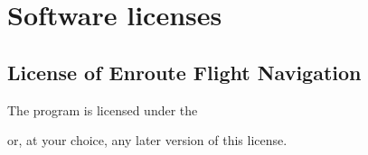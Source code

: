 \documentclass[letterpaper,10pt,english]{sphinxmanual}
\begin{document}
\chapter{Software licenses}
\label{\detokenize{04-appendix/licenses:software-licenses}}\label{\detokenize{04-appendix/licenses::doc}}

\section{License of Enroute Flight Navigation}
\label{\detokenize{04-appendix/licenses:license-of-enroute-flight-navigation}}
\sphinxAtStartPar
The program  is licensed under the %
\begin{footnote}[14]\sphinxAtStartFootnote
{}
%
\end{footnote} or,
at your choice, any later version of this license.
\end{document}

